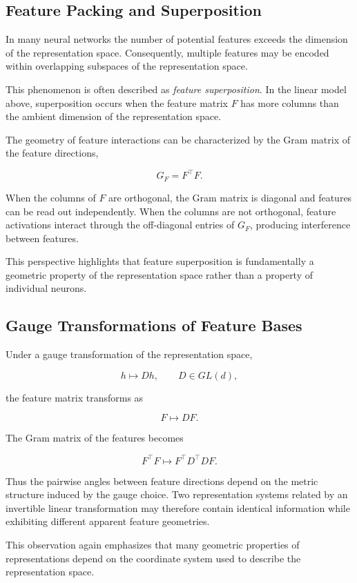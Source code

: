 \documentclass[11pt]{article}
\begin{document}
\subsection{Feature Packing and Superposition}

In many neural networks the number of potential features exceeds the
dimension of the representation space.
Consequently, multiple features may be encoded within overlapping
subspaces of the representation space.

This phenomenon is often described as \emph{feature superposition}.
In the linear model above, superposition occurs when the feature matrix
$F$ has more columns than the ambient dimension of the representation
space.

The geometry of feature interactions can be characterized by the
Gram matrix of the feature directions,

\[
G_F = F^\top F .
\]

When the columns of $F$ are orthogonal, the Gram matrix is diagonal and
features can be read out independently.
When the columns are not orthogonal, feature activations interact through
the off-diagonal entries of $G_F$, producing interference between
features.

This perspective highlights that feature superposition is fundamentally a
geometric property of the representation space rather than a property of
individual neurons.

\subsection{Gauge Transformations of Feature Bases}

Under a gauge transformation of the representation space,

\[
h \mapsto D h,
\qquad
D \in GL(d),
\]

the feature matrix transforms as

\[
F \mapsto D F .
\]

The Gram matrix of the features becomes

\[
F^\top F
\mapsto
F^\top D^\top D F .
\]

Thus the pairwise angles between feature directions depend on the metric
structure induced by the gauge choice.
Two representation systems related by an invertible linear transformation
may therefore contain identical information while exhibiting different
apparent feature geometries.

This observation again emphasizes that many geometric properties of
representations depend on the coordinate system used to describe the
representation space.
\end{document}
